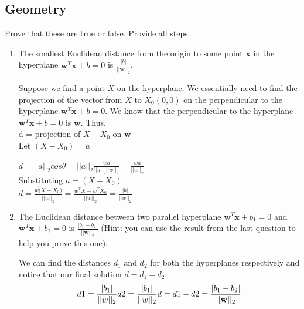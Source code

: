 \documentclass[a4paper]{article}
\theoremstyle{definition}
\newenvironment{soln}{
    \leavevmode\color{blue}\ignorespaces
}{}
\begin{document}
\subsection{Geometry}
Prove that these are true or false. Provide all steps.
\begin{enumerate}
\item 	The smallest Euclidean distance from the origin to some point $\mathbf{x}$ in the hyperplane $\mathbf{w}^T\mathbf{x} + b = 0$ is $\frac{|b|}{||\mathbf{w}||_2}$.\\
\begin{soln}  
	Suppose we find a point $X$ on the hyperplane. We essentially need to find the projection of the vector from $X$ to $X_0(0,0)$ on the perpendicular to the hyperplane $\mathbf{w}^T\mathbf{x} + b = 0$. We know that the perpendicular to the hyperplane $\mathbf{w}^T\mathbf{x} + b = 0$ is $\mathbf{w}$. Thus, \\
	
	d = projection of $X-X_0$ on $\mathbf{w}$\\
	
	Let $(X - X_0) = a$
	
	$d = ||a||_2 cos \theta = ||a||_2 \frac{w a}{||a||_2 ||w||_2}  = \frac{w a}{||w||_2}$ \\
	
	Substituting $a = (X - X_0)$ \\
	
	$d = \frac{w \dot (X - X_0)}{||w||_2} = \frac{w^TX - w^TX_0}{||w||_2} = \frac{|b|}{||w||_2}$
	 
	
	
	
\end{soln}

\item 	The Euclidean distance between two parallel hyperplane $\mathbf{w}^T\mathbf{x} + b_1 = 0$ and $\mathbf{w}^T\mathbf{x} + b_2 = 0$ is $\frac{|b_1 - b_2|}{||\mathbf{w}||_2}$ (Hint: you can use the result from the last question to help you prove this one).

\begin{soln}  We can find the distances $d_1$ and $d_2$ for both the hyperplanes respectively and notice that our final solution $d = d_1 - d_2$. \\
$$
d1 = \frac{|b_1|}{||w||_2} \\
d2 = \frac{|b_1|}{||w||_2} \\ 
d = d1 - d2 = \frac{|b_1 - b_2|}{||\mathbf{w}||_2}
$$ \end{soln}

\end{enumerate}
\end{document}
